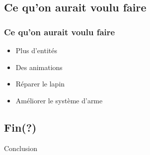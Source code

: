 \documentclass{beamer}
\begin{document}
\subsection{Ce qu'on aurait voulu faire}

\begin{frame} \frametitle{Ce qu'on aurait voulu faire}
	\begin{itemize}
		\item Plus d'entités
		\item Des animations
		\item Réparer le lapin
		\item Améliorer le système d'arme
	\end{itemize}
\end{frame}

\subsection{Fin(?)}

\begin{frame}
	\begin{large}
		\begin{center}
			Conclusion
		\end{center}
	\end{large}
\end{frame}
\end{document}
